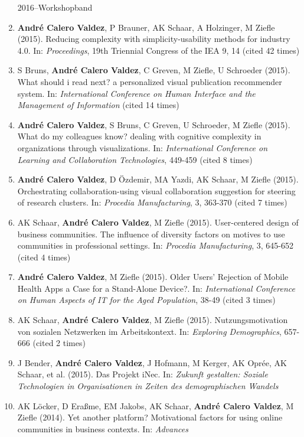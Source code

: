 \documentclass[11pt,a4paper,sans]{moderncv}
\begin{document}
\begin{enumerate}
  2016--Workshopband
\item
  \textbf{André Calero Valdez}, P Brauner, AK Schaar, A Holzinger, M
  Ziefle (2015). Reducing complexity with simplicity-usability methods
  for industry 4.0. In: \emph{Proceedings}, 19th Triennial Congress of
  the IEA 9, 14 (cited 42 times)
\item
  S Bruns, \textbf{André Calero Valdez}, C Greven, M Ziefle, U Schroeder
  (2015). What should i read next? a personalized visual publication
  recommender system. In: \emph{International Conference on Human
  Interface and the Management of Information} (cited 14 times)
\item
  \textbf{André Calero Valdez}, S Bruns, C Greven, U Schroeder, M Ziefle
  (2015). What do my colleagues know? dealing with cognitive complexity
  in organizations through visualizations. In: \emph{International
  Conference on Learning and Collaboration Technologies}, 449-459 (cited
  8 times)
\item
  \textbf{André Calero Valdez}, D Özdemir, MA Yazdi, AK Schaar, M Ziefle
  (2015). Orchestrating collaboration-using visual collaboration
  suggestion for steering of research clusters. In: \emph{Procedia
  Manufacturing}, 3, 363-370 (cited 7 times)
\item
  AK Schaar, \textbf{André Calero Valdez}, M Ziefle (2015).
  User-centered design of business communities. The influence of
  diversity factors on motives to use communities in professional
  settings. In: \emph{Procedia Manufacturing}, 3, 645-652 (cited 4
  times)
\item
  \textbf{André Calero Valdez}, M Ziefle (2015). Older Users' Rejection
  of Mobile Health Apps a Case for a Stand-Alone Device?. In:
  \emph{International Conference on Human Aspects of IT for the Aged
  Population}, 38-49 (cited 3 times)
\item
  AK Schaar, \textbf{André Calero Valdez}, M Ziefle (2015).
  Nutzungsmotivation von sozialen Netzwerken im Arbeitskontext. In:
  \emph{Exploring Demographics}, 657-666 (cited 2 times)
\item
  J Bender, \textbf{André Calero Valdez}, J Hofmann, M Kerger, AK Oprée,
  AK Schaar, et al. (2015). Das Projekt iNec. In: \emph{Zukunft
  gestalten: Soziale Technologien in Organisationen in Zeiten des
  demographischen Wandels}
\item
  AK Löcker, D Eraßme, EM Jakobs, AK Schaar, \textbf{André Calero
  Valdez}, M Ziefle (2014). Yet another platform? Motivational factors
  for using online communities in business contexts. In: \emph{Advances
}
\end{enumerate}
\end{document}
